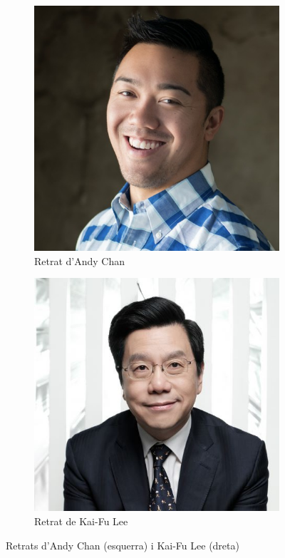 \documentclass[a4paper,12pt]{report}
\begin{document}
\begin{figure}[h!]
    \centering
    \begin{subfigure}[b]{0.45\linewidth}
        \includegraphics[width=\linewidth]{images/1565701087600.jpg}
        \caption{Retrat d'Andy Chan}
        \label{fig:chan}
    \end{subfigure}
    \begin{subfigure}[b]{0.47\linewidth}
        \includegraphics[width=\linewidth]{images/Capture_medium.jpg}
        \caption{Retrat de Kai-Fu Lee}
        \label{fig:lee}
    \end{subfigure}
    \caption{Retrats d'Andy Chan (esquerra) i Kai-Fu Lee (dreta)}
    \label{fig:AndyKai}
\end{figure}
\end{document}
